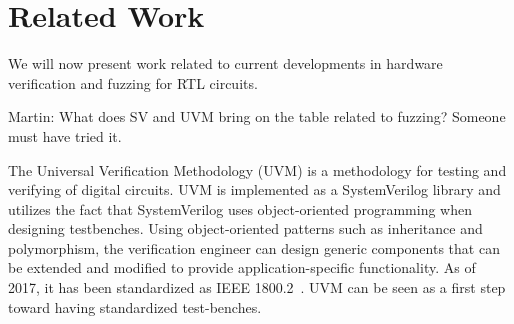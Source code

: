 \documentclass[conference]{IEEEtran}
\newcommand{\martin}[1]{{\color{blue} Martin: #1}}
\newcommand{\rewrite}[1]{{\color{red} rewrite: #1}}
\begin{document}
%
%
%
%
%


\section{Related Work}
\label{sec:related}
We will now present work related to current developments in hardware verification and fuzzing for RTL circuits.

\martin{What does SV and UVM bring on the table related to fuzzing? Someone must have tried it.}

The Universal Verification Methodology (UVM) is a methodology for testing and verifying of digital circuits.
UVM is implemented as a SystemVerilog library and utilizes the fact that SystemVerilog uses object-oriented programming when designing testbenches.
Using object-oriented patterns such as inheritance and polymorphism, the verification engineer can design generic components that can be extended and modified to provide application-specific functionality.
As of 2017, it has been standardized as IEEE 1800.2~\cite{IEEE:18002}.
UVM can be seen as a first step toward having standardized test-benches.
\end{document}
